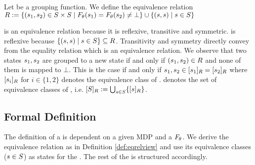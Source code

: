 \documentclass[preview]{standalone}
\begin{document}
\begin{definition}
	Let \grpfct be a grouping function. We define the equivalence relation ${R} :=\{ ({s}_1, {s}_2) \in {S} \times {S} \mid {F_{\ensuremath{{\theta}}}}({s}_1) = {F_{{\theta}}}({s}_2) \neq \bot\} \cup \{({s}, {s})  \mid {s} \in {S}\}$
	
	\label{def:eqrelview}
\end{definition}

\eqrelview is an equivalence relation because it is reflexive, transitive and symmetric. \eqrelview is reflexive because $\{({s}, {s})  \mid {s} \in {S}\} \subseteq {R}$. Transitivity and symmetry directly convey from the equality relation which is an equivalence relation. We observe that two states ${s}_1, {s}_2$ are grouped to a new state if and only if $({s}_1, {s}_2) \in {R}$ and none of them is mapped to $\bot$. This is the case if and only if ${s}_1, {s}_2 \in {\ensuremath{{[{s}_1]_{{R}}}}} = {{[{s}_2]_{{R}}}}$ where ${{[{s}_i]_{{R}}}}$ for $i \in \{1,2\}$ denotes the equivalence class of \eqrelview. \eqclasssetv denotes the set of equivalence classes of \eqrelview, i.e. ${{[{{S}}]_{{R}}}} := \bigcup_{{s} \in {S}}\{{{[{s}]_{{R}}}}\}$.

\subsection{Formal Definition}

The definition of a \viewN is dependent on a given MDP and a \grpfctN ${F_{{\theta}}}$. We derive the equivalence relation \eqrelview as in Definition \ref{def:eqrelview} and use its equivalence classes \eqclassv (${s} \in {S}$) as states for the \viewN. The rest of the \chosengraphtypeN is structured accordingly.
\end{document}
